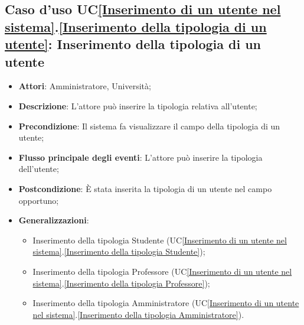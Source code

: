 \subsection{Caso d'uso UC\ref{Inserimento di un utente nel sistema}.\ref{Inserimento della tipologia di un utente}: Inserimento della tipologia di un utente }
\begin{itemize}
	\item \textbf{Attori}: Amministratore, Università;
	\item \textbf{Descrizione}: L'attore può inserire la tipologia relativa all'utente;
	\item \textbf{Precondizione}: Il sistema fa visualizzare il campo della tipologia di un utente;
	
	\item \textbf{Flusso principale degli eventi}: L'attore può inserire la tipologia dell'utente;
	\item \textbf{Postcondizione}: È stata inserita la tipologia di un utente nel campo opportuno;
	\item \textbf{Generalizzazioni}:
	\begin{itemize}
		\item Inserimento della tipologia Studente (UC\ref{Inserimento di un utente nel sistema}.\ref{Inserimento della tipologia Studente}); 
		\item Inserimento della tipologia Professore (UC\ref{Inserimento di un utente nel sistema}.\ref{Inserimento della tipologia Professore});
		\item Inserimento della tipologia Amministratore (UC\ref{Inserimento di un utente nel sistema}.\ref{Inserimento della tipologia Amministratore}).
	\end{itemize}
	
\end{itemize}


